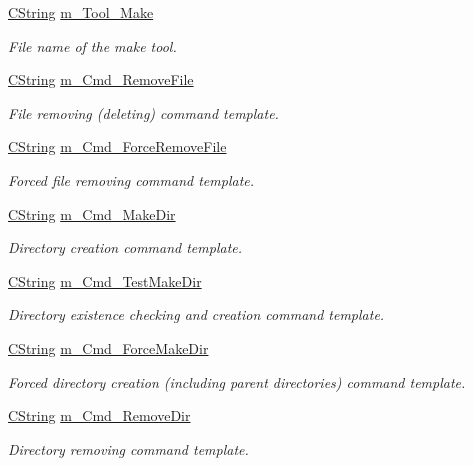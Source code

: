 \begin{DoxyCompactItemize}
\hyperlink{classCString}{C\-String} \hyperlink{classCPlatform_a136a456b5a0293f11605917c177ca271}{m\-\_\-\-Tool\-\_\-\-Make}
\begin{DoxyCompactList}\small\item\em File name of the make tool. \end{DoxyCompactList}\item 
\hyperlink{classCString}{C\-String} \hyperlink{classCPlatform_a40f2310f005d8bece4137fb54d7dffcd}{m\-\_\-\-Cmd\-\_\-\-Remove\-File}
\begin{DoxyCompactList}\small\item\em File removing (deleting) command template. \end{DoxyCompactList}\item 
\hyperlink{classCString}{C\-String} \hyperlink{classCPlatform_a7e9d60712f9a6cb191322f82fe16d6d1}{m\-\_\-\-Cmd\-\_\-\-Force\-Remove\-File}
\begin{DoxyCompactList}\small\item\em Forced file removing command template. \end{DoxyCompactList}\item 
\hyperlink{classCString}{C\-String} \hyperlink{classCPlatform_ad6fb2ef3b64ef90dab2c024dbf1370a5}{m\-\_\-\-Cmd\-\_\-\-Make\-Dir}
\begin{DoxyCompactList}\small\item\em Directory creation command template. \end{DoxyCompactList}\item 
\hyperlink{classCString}{C\-String} \hyperlink{classCPlatform_abac12f91f09a69d46f3851317429185c}{m\-\_\-\-Cmd\-\_\-\-Test\-Make\-Dir}
\begin{DoxyCompactList}\small\item\em Directory existence checking and creation command template. \end{DoxyCompactList}\item 
\hyperlink{classCString}{C\-String} \hyperlink{classCPlatform_a741615f88717233a4f78600b7588415b}{m\-\_\-\-Cmd\-\_\-\-Force\-Make\-Dir}
\begin{DoxyCompactList}\small\item\em Forced directory creation (including parent directories) command template. \end{DoxyCompactList}\item 
\hyperlink{classCString}{C\-String} \hyperlink{classCPlatform_a842c6d884c42744de75eefca15d887e3}{m\-\_\-\-Cmd\-\_\-\-Remove\-Dir}
\begin{DoxyCompactList}\small\item\em Directory removing command template. \end{DoxyCompactList}\item 

\end{DoxyCompactItemize}

